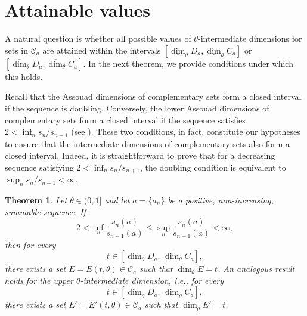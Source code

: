 \documentclass[11pt,reqno,bookmarksnumbered,raiselinks,breaklinks,colorlinks,plainpages]{amsart}
\newtheorem{theo}{Theorem}[section]
\begin{document}
\section{Attainable values}
A natural question is whether all possible values of $\theta$-intermediate dimensions for sets in $\mathcal{C}_a$ are attained within the intervals $[\underline{\dim}_\theta D_{a}, \underline{\dim}_\theta C_{a}]$ or $[\overline{\dim}_\theta D_{a}, \overline{\dim}_\theta C_{a}]$. In the next theorem, we provide conditions under which this holds.

Recall that the Assouad dimensions of complementary sets form a closed interval if the sequence is doubling. Conversely, the lower Assouad dimensions of complementary sets form a closed interval if the sequence satisfies $2 < \inf_n s_n/s_{n+1}$ (see \cite{garcia2018assouad}). These two conditions, in fact, constitute our hypotheses to ensure that the intermediate dimensions of complementary sets also form a closed interval. Indeed, it is straightforward to prove that for a decreasing sequence satisfying $2 < \inf_n s_n/s_{n+1}$, the doubling condition is equivalent to $\sup_n s_n/s_{n+1} < \infty$.

\begin{theo}\label{Maintheo}
Let \( \theta \in (0,1] \) and let \( a = \{a_n\} \) be a positive, non-increasing, summable sequence. If 
\[
2 < \inf_n \frac{s_n(a)}{s_{n+1}(a)} \leq \sup_n \frac{s_n(a)}{s_{n+1}(a)} < \infty,
\]
then for every 
\[
t \in \left[ \overline{\dim}_\theta D_a, \, \overline{\dim}_\theta C_a \right],
\]
there exists a set \( E = E(t, \theta) \in \mathcal{C}_a \) such that \( \overline{\dim}_\theta E = t \). An analogous result holds for the upper $\theta$-intermediate dimension, i.e., for every 
\[
t \in \left[ \underline{\dim}_\theta D_a, \, \underline{\dim}_\theta C_a \right],
\]
there exists a set \( E' = E'(t, \theta) \in \mathcal{C}_a \) such that \( \underline{\dim}_\theta E' = t \).
\end{theo}
\end{document}
